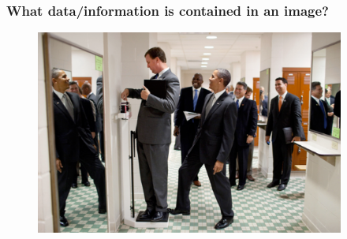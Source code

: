 \documentclass[xcolor={dvipsnames}]{beamer}
\begin{document}
\frame
{
 \frametitle{What data/information is contained in an image?}

\begin{figure}
\centering
\includegraphics[width=4in]{stuff/obams.png}
\end{figure}

}
\end{document}
